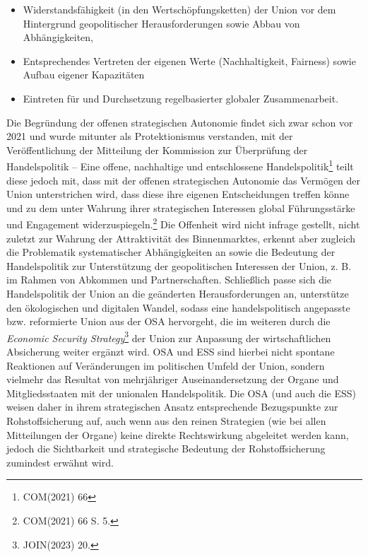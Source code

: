 \documentclass[12pt,a4paper,oneside]{book} %
\begin{document}
\begin{itemize}
	\item Widerstandsfähigkeit (in den Wertschöpfungsketten) der Union vor dem Hintergrund geopolitischer Herausforderungen sowie Abbau von Abhängigkeiten,
	\item Entsprechendes Vertreten der eigenen Werte (Nachhaltigkeit, Fairness) sowie Aufbau eigener Kapazitäten
	\item Eintreten für und Durchsetzung regelbasierter globaler Zusammenarbeit.\autocites{ZRP 2023, 207}{DGAP Policy Brief 8/2021}{COM 2021 66, S. 4f.}
\end{itemize}

Die Begründung der offenen strategischen Autonomie findet sich zwar schon vor 2021 und wurde mitunter als Protektionismus verstanden,\autocite{DGAP Policy Brief 8/2021} mit der Veröffentlichung der Mitteilung der Kommission zur \glqq Überprüfung der Handelspolitik -- Eine offene, nachhaltige und entschlossene Handelspolitik\grqq\footnote{COM(2021) 66} teilt diese jedoch mit, dass mit der offenen strategischen Autonomie das Vermögen der Union unterstrichen wird, dass diese ihre eigenen Entscheidungen treffen könne und zu dem unter Wahrung ihrer strategischen Interessen global Führungsstärke und Engagement widerzuspiegeln.\footnote{COM(2021) 66 S. 5.} Die Offenheit wird nicht infrage gestellt, nicht zuletzt zur Wahrung der Attraktivität des Binnenmarktes, erkennt aber zugleich die Problematik systematischer Abhängigkeiten an sowie die Bedeutung der Handelspolitik zur Unterstützung der geopolitischen Interessen der Union, z. B. im Rahmen von Abkommen und Partnerschaften. Schließlich passe sich die Handelspolitik der Union an die geänderten Herausforderungen an, unterstütze den ökologischen und digitalen Wandel, sodass eine handelspolitisch angepasste bzw. reformierte Union aus der OSA hervorgeht, die im weiteren durch die \textit{Economic Security Strategy}\footnote{JOIN(2023) 20.} der Union zur Anpassung der wirtschaftlichen Absicherung weiter ergänzt wird. OSA und ESS sind hierbei nicht spontane Reaktionen auf Veränderungen im politischen Umfeld der Union, sondern vielmehr das Resultat von mehrjähriger Auseinandersetzung der Organe und Mitgliedsstaaten mit der unionalen Handelspolitik.\autocite{Schmitz/Seidl JCMS 61 (2023), 834 (839 ff.);}
Die OSA (und auch die ESS) weisen daher in ihrem strategischen Ansatz entsprechende Bezugspunkte zur Rohstoffsicherung auf, auch wenn aus den reinen Strategien (wie bei allen Mitteilungen der Organe) keine direkte Rechtswirkung abgeleitet werden kann, jedoch die Sichtbarkeit und strategische Bedeutung der Rohstoffsicherung zumindest erwähnt wird.
\end{document}
